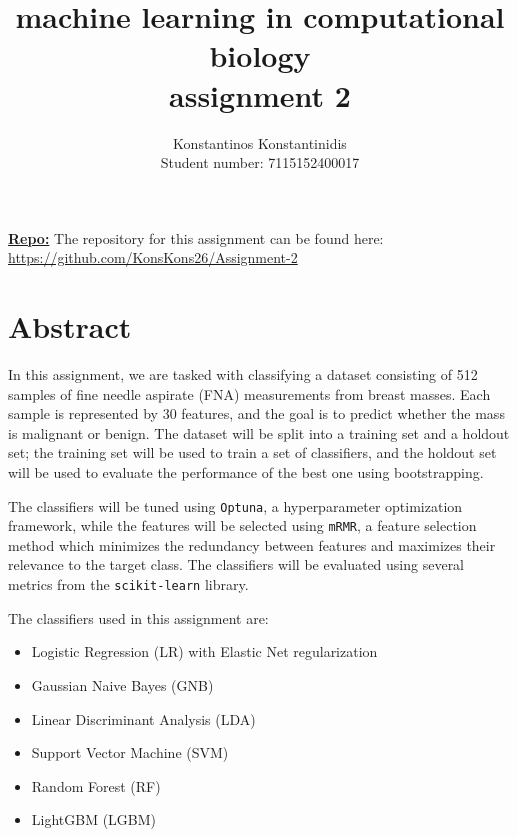 \documentclass[12pt]{article}
\title{%
    machine learning in computational biology \\
    \Large assignment 2
    }
\author{%
    Konstantinos Konstantinidis \\
    Student number: 7115152400017
    }
\begin{document}
\maketitle

\vspace{0.5in}

\textbf{\underline{Repo:}} The repository for this assignment can be found %
here: \\
\url{https://github.com/KonsKons26/Assignment-2}

\vspace{0.5in}

\tableofcontents
\clearpage



\section{Abstract}

In this assignment, we are tasked with classifying a dataset consisting of 512
samples of fine needle aspirate (FNA) measurements from breast masses. Each
sample is represented by 30 features, and the goal is to predict whether the
mass is malignant or benign. The dataset will be split into a training set and a
holdout set; the training set will be used to train a set of classifiers, and
the holdout set will be used to evaluate the performance of the best one using
bootstrapping.

The classifiers will be tuned using \texttt{Optuna}, a hyperparameter
optimization framework, while the features will be selected using \texttt{mRMR},
a feature selection method which minimizes the redundancy between features and
maximizes their relevance to the target class. The classifiers will be evaluated
using several metrics from the \texttt{scikit-learn} library.

The classifiers used in this assignment are:

\begin{itemize}
    \item Logistic Regression (LR) with Elastic Net regularization
    \item Gaussian Naive Bayes (GNB)
    \item Linear Discriminant Analysis (LDA)
    \item Support Vector Machine (SVM)
    \item Random Forest (RF)
    \item LightGBM (LGBM)
\end{itemize}
\end{document}
